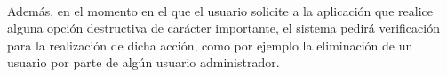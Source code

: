   \paragraph{}Además, en el momento en el que el usuario solicite a la
  aplicación que realice alguna opción destructiva de carácter importante, el
  sistema pedirá verificación para la realización de dicha acción, como por
  ejemplo la eliminación de un usuario por parte de algún usuario administrador.
